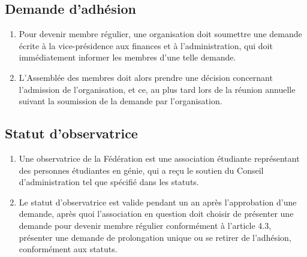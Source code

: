 \subsection{Demande d'adhésion}
\label{demande-d-adhesion}

\begin{enumerate}
 \item
  Pour devenir membre régulier, une organisation doit soumettre une demande écrite à la vice-présidence aux finances et à l’administration, qui doit immédiatement informer les membres d'une telle demande.
 \item
  L'Assemblée des membres doit alors prendre une décision concernant l'admission de l'organisation, et ce, au plus tard lors de la réunion annuelle suivant la soumission de la demande par l'organisation.
\end{enumerate}

\subsection{Statut d'observatrice}
\label{statut-dobservateur-ou-dobservatrice}

\begin{enumerate}
 \item
  Une observatrice de la Fédération est une association étudiante représentant des personnes étudiantes en génie, qui a reçu le soutien du Conseil d'administration tel que spécifié dans les statuts.
 \item
  Le statut d'observatrice est valide pendant un an après l'approbation d'une demande, après quoi l’association en question doit choisir de présenter une demande pour devenir membre régulier conformément à l'article 4.3, présenter une demande de prolongation unique ou se retirer de l'adhésion, conformément aux statuts.
\end{enumerate}
